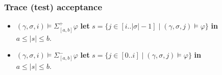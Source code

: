\begin{frame}
  \frametitle{Trace (test) acceptance} \small

\begin{itemize}

\item $(\gamma,\sigma,i) \models \Sigma^{+}_{[a,b]} \varphi$ \tabto{\tabconst} \iff{} 
{\bf let} $s = \{ j \in [ i..|\sigma|-1 ] \;|\; (\gamma,\sigma,j) \models \varphi \}$ {\bf in}\\
\tabto{\tabconste}  $a \leq |s| \leq b$.

\item $(\gamma,\sigma,i) \models \Sigma^{-}_{[a,b]} \varphi$ \tabto{\tabconst} \iff{} 
{\bf let} $s = \{ j \in [ 0..i ] \;|\; (\gamma,\sigma,j) \models \varphi \}$ {\bf in}\\
\tabto{\tabconste}  $a \leq |s| \leq b$.

\end{itemize}

\end{frame}